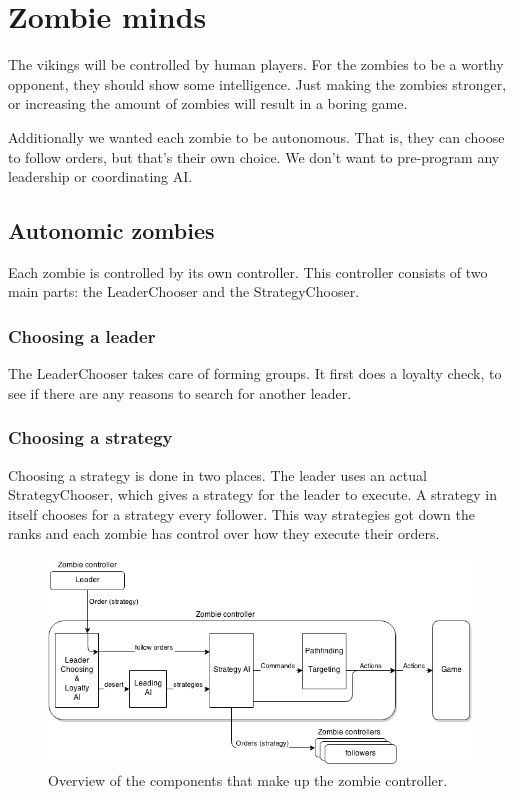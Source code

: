 \section{Zombie minds}

The vikings will be controlled by human players. For the zombies to be a worthy opponent, they should show some intelligence. Just making the zombies stronger, or increasing the amount of zombies will result in a boring game.

Additionally we wanted each zombie to be autonomous. That is, they can choose to follow orders, but that's their own choice. We don't want to pre-program any leadership or coordinating AI.

\subsection{Autonomic zombies}
Each zombie is controlled by its own controller. This controller consists of two main parts: the LeaderChooser and the StrategyChooser.

\subsubsection{Choosing a leader}
The LeaderChooser takes care of forming groups. It first does a loyalty check, to see if there are any reasons to search for another leader.

\subsubsection{Choosing a strategy}
Choosing a strategy is done in two places. The leader uses an actual StrategyChooser, which gives a strategy for the leader to execute. A strategy in itself chooses for a strategy every follower. This way strategies got down the ranks and each zombie has control over how they execute their orders.

\begin{figure}[!htb]
	\centering
	\includegraphics[width=\textwidth]{zombie-controller.png}
	\caption{Overview of the components that make up the zombie controller.}
\end{figure}

